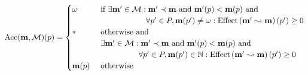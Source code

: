 \[
  \Acc(\mar, \setm)(p) =
  \begin{cases}
    \omega  & \tif \exists \marp \in \setm : \marp \prec \mar \tand \marp(p) < \mar(p) \tand\\
            & \phantom{\tif \exists \marp \in \setm : }
              \forall p' \in \places, \mar(p') \neq \omega: \effect{\mpath{\mar'}{\mar}}(p') \geq 0\\
    *       & \tothrwand\\
            & \text{ }\exists \mar' \in \setm : \mar' \prec \mar \tand \mar'(p) < \mar(p) \tand\\
            & \phantom{\text{ }\exists \mar' \in \setm :}
              \forall p' \in \places, \mar(p') \in \naturals: \effect{\mpath{\mar'}{\mar}}(p') \geq 0 \\
    \mar(p) & \tothrw
  \end{cases}
\]

